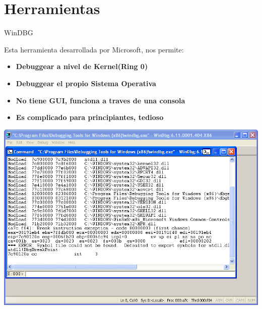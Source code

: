 \documentclass{beamer}
\begin{document}
\section{Herramientas}

\begin{frame}{WinDBG}

Esta herramienta desarrollada por Microsoft, nos permite:
\begin{itemize}
\item \textbf{Debuggear a nivel de Kernel(Ring 0)}
\item \textbf{Debuggear el propio Sistema Operativa}
\item \textbf{No tiene GUI, funciona a traves de una consola}
\item \textbf{Es complicado para principiantes, tedioso}
\end{itemize}
\begin{center}
\includegraphics[scale=0.21]{windbg.png}
\end{center}

\end{frame}
\end{document}
